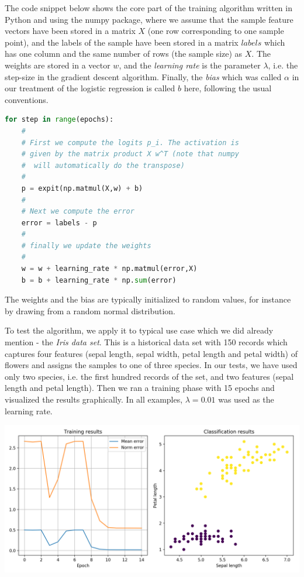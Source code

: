 \documentclass[a4paper, draft]{report}
\numberwithin{section}{chapter}
\numberwithin{equation}{chapter}
\theoremstyle{own}
\theoremstyle{remark}
\begin{document}
The code snippet below shows the core part of the training algorithm written in Python and using the numpy package, where we assume that the sample feature vectors have been stored in a matrix $X$ (one row corresponding to one sample point), and the labels of the sample have been stored in a matrix $labels$ which has one column and the same number of rows (the sample size) as $X$. The weights are stored in a vector $w$, and the {\em learning rate} is the parameter $\lambda$, i.e. the step-size in the gradient descent algorithm. Finally, the {\em bias} which was called $\alpha$ in our treatment of the logistic regression is called $b$ here, following the usual conventions.

\begin{lstlisting}[frame=single,language=Python,caption=Implementation of the training phase in Python]
for step in range(epochs):
    # 
    # First we compute the logits p_i. The activation is
    # given by the matrix product X w^T (note that numpy 
    #  will automatically do the transpose)
    #
    p = expit(np.matmul(X,w) + b)
    # 
    # Next we compute the error
    error = labels - p
    #
    # finally we update the weights
    #
    w = w + learning_rate * np.matmul(error,X)
    b = b + learning_rate * np.sum(error)
\end{lstlisting}

The weights and the bias are typically initialized to random values, for instance by drawing from a random normal distribution. 

To test the algorithm, we apply it to typical use case which we did already mention - the {\em Iris data set}. This is a historical data set with 150 records which captures four features (sepal length, sepal width, petal length and petal width) of flowers and assigns the samples to one of three species. In our tests, we have used only two species, i.e. the first hundred records of the set, and two features (sepal length and petal length). Then we ran a training phase with 15 epochs and visualized the results graphically. In all examples, $\lambda = 0.01$ was used as the learning rate.

\includegraphics[scale=0.47]{LogisticRegressionIris.png}
\end{document}
